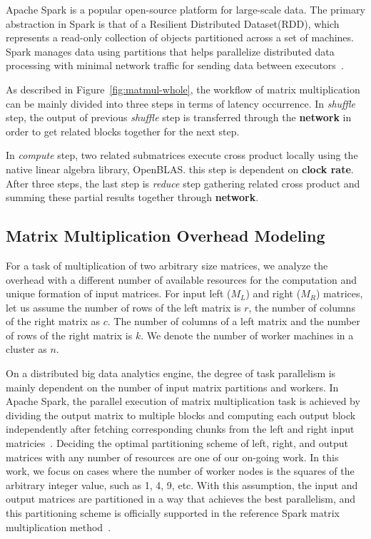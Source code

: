\documentclass[10pt, conference, compsocconf]{IEEEtran}
\begin{document}
Apache Spark is a popular open-source platform for large-scale data. The primary abstraction in Spark is that of a Resilient Distributed Dataset(RDD), which represents a read-only collection of objects partitioned across a set of machines. Spark manages data using partitions that helps parallelize distributed data processing with minimal network traffic for sending data between executors~\cite{spark}. 

As described in Figure~\ref{fig:matmul-whole}, the workflow of matrix multiplication can be mainly divided into three steps in terms of latency occurrence. In \textit{shuffle} step, the output of previous \textit{shuffle} step is transferred through the \textbf{network} in order to get related blocks together for the next step.

In \textit{compute} step, two related submatrices execute cross product locally using the native linear algebra library, OpenBLAS. this step is dependent on \textbf{clock rate}. After three steps, the last step is \textit{reduce} step gathering related cross product and summing these partial results together through \textbf{network}.

\subsection{Matrix Multiplication Overhead Modeling}
For a task of multiplication of two arbitrary size matrices, we analyze the overhead with a different number of available resources for the computation and unique formation of input matrices. For input left ($M_L$) and right ($M_R$) matrices, let us assume the number of rows of the left matrix is $r$, the number of columns of the right matrix as $c$. The number of columns of a left matrix and the number of rows of the right matrix is $k$. We denote the number of worker machines in a cluster as $n$.

On a distributed big data analytics engine, the degree of task parallelism is mainly dependent on the number of input matrix partitions and workers. In Apache Spark, the parallel execution of matrix multiplication task is achieved by dividing the output matrix to multiple blocks and computing each output block independently after fetching corresponding chunks from the left and right input matricies~\cite{spark-mm}. Deciding the optimal partitioning scheme of left, right, and output matrices with any number of resources are one of our on-going work. In this work, we focus on cases where the number of worker nodes is the squares of the arbitrary integer value, such as 1, 4, 9, etc. With this assumption, the input and output matrices are partitioned in a way that achieves the best parallelism, and this partitioning scheme is officially supported in the reference Spark matrix multiplication method~\cite{spark-mm-code}.
\end{document}
